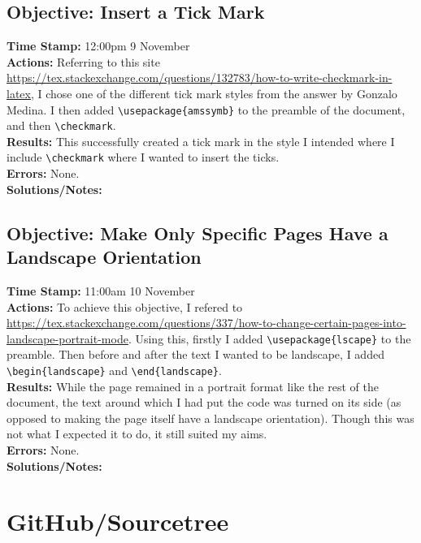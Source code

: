 \documentclass{article}
\begin{document}
\begin{FlushLeft}
\subsection{Objective: Insert a Tick Mark}
\textbf{Time Stamp:} 12:00pm 9 November\\
\textbf{Actions:} Referring to this site \url{https://tex.stackexchange.com/questions/132783/how-to-write-checkmark-in-latex}, I chose one of the different tick mark styles from the answer by Gonzalo Medina. I then added \verb|\usepackage{amssymb}| to the preamble of the document, and then \verb|\checkmark|.\\
\textbf{Results:} This successfully created a tick mark in the style I intended where I include \verb|\checkmark| where I wanted to insert the ticks.\\
\textbf{Errors:} None.\\
\textbf{Solutions/Notes:} 

\subsection{Objective: Make Only Specific Pages Have a Landscape Orientation}
\textbf{Time Stamp:} 11:00am 10 November\\
\textbf{Actions:} To achieve this objective, I refered to \url{https://tex.stackexchange.com/questions/337/how-to-change-certain-pages-into-landscape-portrait-mode}. Using this, firstly I added \verb|\usepackage{lscape}| to the preamble. Then before and after the text I wanted to be landscape, I added \verb|\begin{landscape}| and \verb|\end{landscape}|.\\
\textbf{Results:} While the page remained in a portrait format like the rest of the document, the text around which I had put the code was turned on its side (as opposed to making the page itself have a landscape orientation). Though this was not what I expected it to do, it still suited my aims.\\
\textbf{Errors:} None.\\
\textbf{Solutions/Notes:} 



\pagebreak

\section{GitHub/Sourcetree}


\end{FlushLeft}
\end{document}
